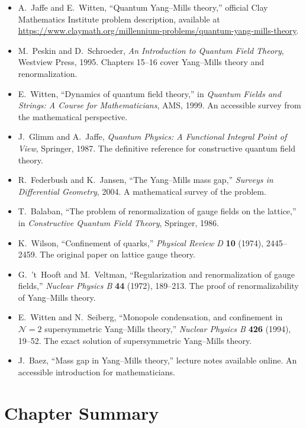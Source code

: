 \begin{itemize}
  \item A.~Jaffe and E.~Witten, ``Quantum Yang--Mills theory,'' official Clay Mathematics Institute problem description, available at \url{https://www.claymath.org/millennium-problems/quantum-yang-mills-theory}.
  \item M.~Peskin and D.~Schroeder, \textit{An Introduction to Quantum Field Theory}, Westview Press, 1995. Chapters 15--16 cover Yang--Mills theory and renormalization.
  \item E.~Witten, ``Dynamics of quantum field theory,'' in \textit{Quantum Fields and Strings: A Course for Mathematicians}, AMS, 1999. An accessible survey from the mathematical perspective.
  \item J.~Glimm and A.~Jaffe, \textit{Quantum Physics: A Functional Integral Point of View}, Springer, 1987. The definitive reference for constructive quantum field theory.
  \item R.~Federbush and K.~Jansen, ``The Yang--Mills mass gap,'' \textit{Surveys in Differential Geometry}, 2004. A mathematical survey of the problem.
  \item T.~Balaban, ``The problem of renormalization of gauge fields on the lattice,'' in \textit{Constructive Quantum Field Theory}, Springer, 1986.
  \item K.~Wilson, ``Confinement of quarks,'' \textit{Physical Review D} \textbf{10} (1974), 2445--2459. The original paper on lattice gauge theory.
  \item G.~'t~Hooft and M.~Veltman, ``Regularization and renormalization of gauge fields,'' \textit{Nuclear Physics B} \textbf{44} (1972), 189--213. The proof of renormalizability of Yang--Mills theory.
  \item E.~Witten and N.~Seiberg, ``Monopole condensation, and confinement in $\mathcal{N}=2$ supersymmetric Yang--Mills theory,'' \textit{Nuclear Physics B} \textbf{426} (1994), 19--52. The exact solution of supersymmetric Yang--Mills theory.
  \item J.~Baez, ``Mass gap in Yang--Mills theory,'' lecture notes available online. An accessible introduction for mathematicians.
\end{itemize}

\section*{Chapter Summary}

